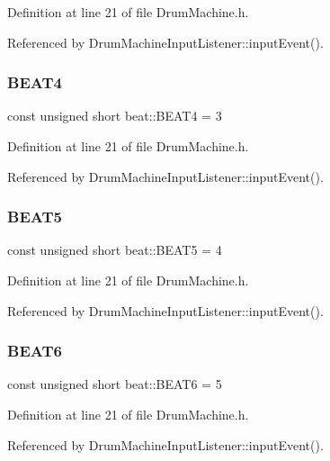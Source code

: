 Definition at line 21 of file Drum\+Machine.\+h.



Referenced by Drum\+Machine\+Input\+Listener\+::input\+Event().

\mbox{\label{namespacebeat_acb66407079f4f750c8edf7c1bd8519df}} 
\subsubsection{\texorpdfstring{B\+E\+A\+T4}{BEAT4}}
{\footnotesize\ttfamily const unsigned short beat\+::\+B\+E\+A\+T4 = 3}



Definition at line 21 of file Drum\+Machine.\+h.



Referenced by Drum\+Machine\+Input\+Listener\+::input\+Event().

\mbox{\label{namespacebeat_a1707525607992183af84b75b13bdcf1c}} 
\subsubsection{\texorpdfstring{B\+E\+A\+T5}{BEAT5}}
{\footnotesize\ttfamily const unsigned short beat\+::\+B\+E\+A\+T5 = 4}



Definition at line 21 of file Drum\+Machine.\+h.



Referenced by Drum\+Machine\+Input\+Listener\+::input\+Event().

\mbox{\label{namespacebeat_a38be39fd5d7424553131d77620a5fbfc}} 
\subsubsection{\texorpdfstring{B\+E\+A\+T6}{BEAT6}}
{\footnotesize\ttfamily const unsigned short beat\+::\+B\+E\+A\+T6 = 5}



Definition at line 21 of file Drum\+Machine.\+h.



Referenced by Drum\+Machine\+Input\+Listener\+::input\+Event().

